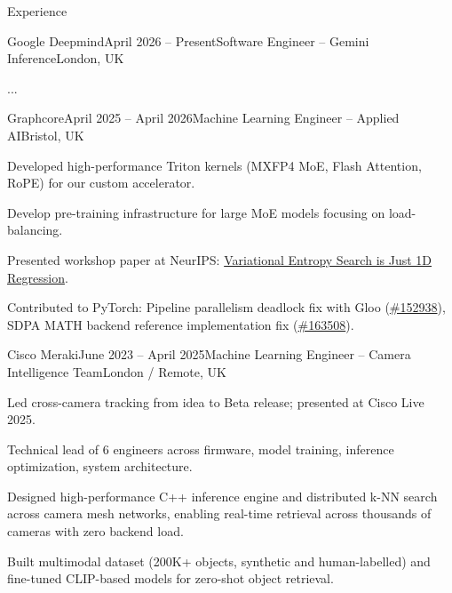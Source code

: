 \documentclass{structure}
\begin{document}
\begin{rSection}{Experience}
    \begin{rSubsection}{Google Deepmind}{April 2026 -- Present}{Software Engineer -- Gemini Inference}{London, UK}{}{}
        \item ...
    \end{rSubsection}

    \begin{rSubsection}{Graphcore}{April 2025 -- April 2026}{Machine Learning Engineer -- Applied AI}{Bristol, UK}{}{}
        \item Developed high-performance Triton kernels (MXFP4 MoE, Flash Attention, RoPE) for our custom accelerator.

        \item Develop pre-training infrastructure for large MoE models focusing on load-balancing.

        \item Presented workshop paper at NeurIPS: {\color{blue}\href{https://openreview.net/pdf?id=JPXNOiOiod}{Variational Entropy Search is Just 1D Regression}}.

        \item Contributed to PyTorch: Pipeline parallelism deadlock fix with Gloo (\href{https://github.com/pytorch/pytorch/pull/152938}{\#152938}), SDPA MATH backend reference implementation fix (\href{https://github.com/pytorch/pytorch/pull/163508}{\#163508}).

    \end{rSubsection}

    \begin{rSubsection}{Cisco Meraki}{June 2023 -- April 2025}{Machine Learning Engineer -- Camera Intelligence Team}{London / Remote, UK}{}{}
        \item Led cross-camera tracking from idea to Beta release; presented at Cisco Live 2025.

        \item Technical lead of 6 engineers across firmware, model training, inference optimization, system architecture.

        \item Designed high-performance C++ inference engine and distributed k-NN search across camera mesh networks, enabling real-time retrieval across thousands of cameras with zero backend load.

        \item Built multimodal dataset (200K+ objects, synthetic and human-labelled) and fine-tuned CLIP-based models for zero-shot object retrieval.
    \end{rSubsection}

\end{rSection}
\end{document}
